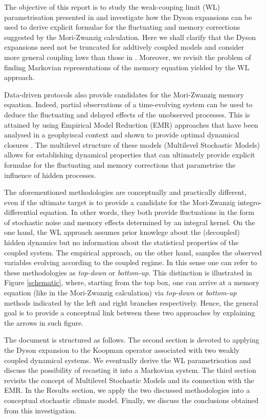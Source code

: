 \documentclass[12pt]{article}
\begin{document}
The objective of this report is to study the weak-couping limit (WL) parametrisation presented in \cite{Wouters2012, wouters2013} and investigate how the Dyson expansions can be used to derive explicit formulae for the fluctuating and memory corrections suggested by the Mori-Zwanzig calculation. Here we shall clarify that the Dyson expansions need not be truncated for addtively coupled models and consider more general coupling laws than those in \cite{wouters2013}. Moreover, we revisit the problem of finding Markovian representations of the memory equation yielded by the WL approach.

Data-driven protocols also provide candidates for the Mori-Zwanzig memory equation. Indeed, partial observations of a time-evolving system can be used to deduce the fluctuating and delayed effects of the unobserved processes. This is attained by using Empirical Model Reduction (EMR) approaches that have been analysed in a geophyiscal context \cite{Kravtsov2005} and shown to provide optimal dynamical closures \cite{kondrashovdata2015}. The multilevel structure of these models (Multilevel Stochastic Models) allows for establishing dynamical properties that can ultimately provide explicit formulae for the fluctuating and memory corrections that parametrise the influence of hidden processes.

The aforementioned methodologies are conceptually and practically different, even if the ultimate target is to provide a candidate for the Mori-Zwanzig integro-differential equation. In other words, they both provide fluctuations in the form of stochastic noise and memory effects determined by an integral kernel. On the one hand, the WL approach assumes prior knowlege about the (decoupled) hidden dynamics but no information about the statistical properties of the coupled system. The empirical approach, on the other hand, samples the observed variables evolving according to the coupled regime. In this sense one can refer to these methodologies as \emph{top-down} or \emph{bottom-up}. This distinction is illustrated in Figure \ref{schematic}, where, starting from the top box, one can arrive at a memory equation (like in the Mori-Zwanzig calculation) via \emph{top-down} or \emph{bottom-up} methods indicated by the left and right branches respectively. Hence, the general goal is to provide a conceptual link between these two approaches by explaining the arrows in such figure.

The document is structured as follows. The second section is devoted to applying the Dyson expansion to the Koopman operator associated with two weakly coupled dynamical systems. We eventually derive the WL parametrisation and discuss the possibility of recasting it into a Markovian system. The third section revisits the concept of Multilevel Stochastic Models and its connection with the EMR. In the Results section, we apply the two discussed methodologies into a conceptual stochastic climate model. Finally, we discuss the conclusions obtained from this investigation.
\end{document}
